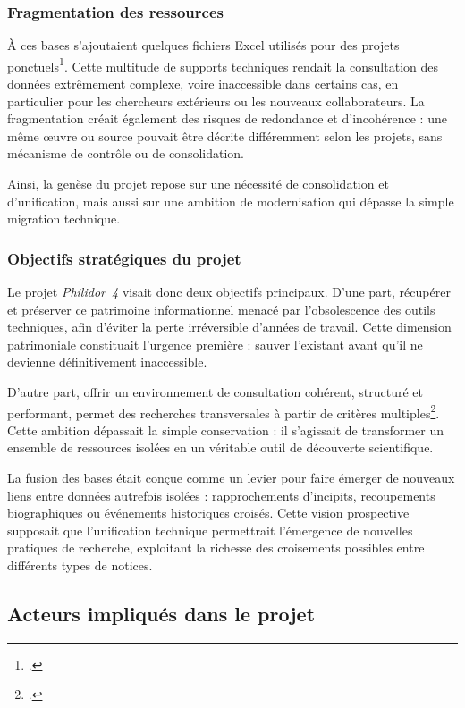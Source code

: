 \subsubsection{Fragmentation des ressources}

À ces bases s'ajoutaient quelques fichiers Excel utilisés pour des projets ponctuels\footcite{laurentguilloRapportMigrationAnciennes2022}. Cette multitude de supports techniques rendait la consultation des données extrêmement complexe, voire inaccessible dans certains cas, en particulier pour les chercheurs extérieurs ou les nouveaux collaborateurs. La fragmentation créait également des risques de redondance et d'incohérence : une même œuvre ou source pouvait être décrite différemment selon les projets, sans mécanisme de contrôle ou de consolidation.

Ainsi, la genèse du projet repose sur une nécessité de consolidation et d'unification, mais aussi sur une ambition de modernisation qui dépasse la simple migration technique.

\subsubsection{Objectifs stratégiques du projet}

Le projet \textit{Philidor~4} visait donc deux objectifs principaux. D'une part, récupérer et préserver ce patrimoine informationnel menacé par l'obsolescence des outils techniques, afin d'éviter la perte irréversible d'années de travail. Cette dimension patrimoniale constituait l'urgence première : sauver l'existant avant qu'il ne devienne définitivement inaccessible.

D'autre part, offrir un environnement de consultation cohérent, structuré et performant, permet des recherches transversales à partir de critères multiples\footcite{laurentguilloRapportMigrationAnciennes2022}. Cette ambition dépassait la simple conservation : il s'agissait de transformer un ensemble de ressources isolées en un véritable outil de découverte scientifique.

La fusion des bases était conçue comme un levier pour faire émerger de nouveaux liens entre données autrefois isolées : rapprochements d'incipits, recoupements biographiques ou événements historiques croisés. Cette vision prospective supposait que l'unification technique permettrait l'émergence de nouvelles pratiques de recherche, exploitant la richesse des croisements possibles entre différents types de notices.

\subsection{Acteurs impliqués dans le projet}

